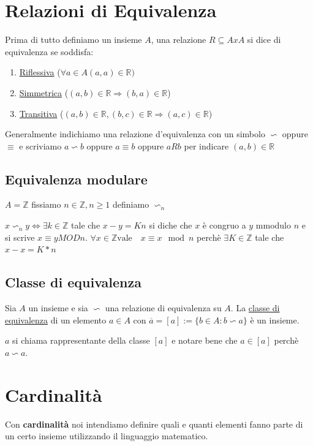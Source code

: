 \documentclass{article}
\begin{document}
\section{Relazioni di Equivalenza}
Prima di tutto definiamo un insieme $A$, una relazione $R \subseteq AxA$ si dice di equivalenza se soddisfa:
\begin{enumerate}
        \item \underline{Riflessiva} ($\forall a \in A (a,a) \in \mathbb{R})$
        \item \underline{Simmetrica} ($(a,b) \in \mathbb{R} \Rightarrow (b,a) \in \mathbb{R}$)
        \item \underline{Transitiva} ($(a,b) \in \mathbb{R},(b,c) \in \mathbb{R} \Rightarrow (a,c) \in \mathbb{R}$)
\end{enumerate}

Generalmente indichiamo una relazione d'equivalenza con un simbolo  $\backsim$ oppure $\equiv$ e scriviamo $a \backsim b$ oppure $a \equiv b$ oppure $aRb$ per indicare $(a,b) \in \mathbb{R}$



\subsection{Equivalenza modulare}
$A = \mathbb{Z}$ fissiamo $n \in \mathbb{Z}, n \geq 1$ definiamo $\backsim_n$ \par
$x \backsim_n y \Leftrightarrow \exists k \in \mathbb{Z}$ tale che $x-y = Kn$ si diche che $x$ è congruo a $y$ mmodulo $n$ e si scrive $x \equiv y MOD n$.
$\forall x \in \mathbb{Z} \mbox{vale} \quad x \equiv x \mod n$ perchè $\exists K \in \mathbb{Z}$ tale che $x-x = K*n$ 



\subsection{Classe di equivalenza}
Sia $A$ un insieme e sia $\backsim$ una relazione di equivalenza su $A$. La \underline{classe di equivalenza} di un elemento $a \in A$ con $\overline{a} = [a] := \{b\in A : b \backsim a\}$ è un insieme. \par
$a$ si chiama rappresentante della classe $[a]$ e notare bene che $a \in [a]$ perchè $a \backsim a$.






\newpage
\section{Cardinalità}
Con \textbf{cardinalità} noi intendiamo definire quali e quanti elementi fanno parte di un certo insieme utilizzando il linguaggio matematico. \par
\end{document}
